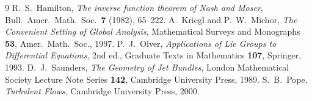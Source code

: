 \documentclass[11pt]{article}
\theoremstyle{definition}
\theoremstyle{remark}
\begin{document}
\begin{thebibliography}{9}
 R.\ S.\ Hamilton, \emph{The inverse function theorem of
Nash and Moser}, Bull.\ Amer.\ Math.\ Soc.\ \textbf{7} (1982), 65--222.
 A.\ Kriegl and P.\ W.\ Michor, \emph{The Convenient Setting
of Global Analysis}, Mathematical Surveys and Monographs \textbf{53}, Amer.\
Math.\ Soc., 1997.
 P.\ J.\ Olver, \emph{Applications of Lie Groups to
Differential Equations}, 2nd ed., Graduate Texts in Mathematics
\textbf{107}, Springer, 1993.
 D.\ J.\ Saunders, \emph{The Geometry of Jet Bundles},
London Mathematical Society Lecture Note Series \textbf{142}, Cambridge
University Press, 1989.
 S.\ B.\ Pope, \emph{Turbulent Flows}, Cambridge University
Press, 2000.
\end{thebibliography}
\end{document}
